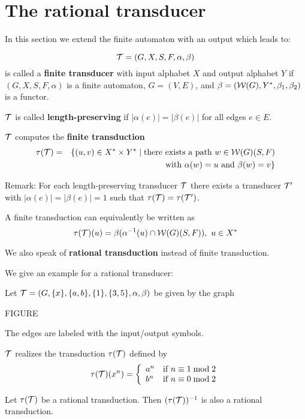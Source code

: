 \section{The rational transducer}

In this section we extend the finite automaton with an output which leads to:

\begin{definition}
\[ \mbox{$\mathcal{T}$} = (G, X, S, F, \alpha, \beta) \] is called a {\bf finite transducer}
with input alphabet $X$ and output alphabet $Y$ if $(G, X, S, F, \alpha)$ is a
finite automaton, $G = (V, E)$, and $\beta = (\mbox{$\mathcal{W}(G)$}, Y^*, \beta_1,
\beta_2)$ is a functor.
\end{definition}

$\mbox{$\mathcal{T}$}$ is called {\bf length-preserving} if $|\alpha(e)| = |\beta(e)|$ for all
edges $e \in E$.

$\mbox{$\mathcal{T}$}$ computes the {\bf finite transduction}
\begin{eqnarray*}
\tau(\mbox{$\mathcal{T}$}) & = & \{ (u, v) \in X^* \times Y^* \mid \mbox{there
exists a path } w \in \mbox{$\mathcal{W}(G)$}(S, F) \\
& &  \mbox{ with } \alpha(w) = u \mbox{ and } \beta(w) = v \}
\end{eqnarray*}

Remark: For each length-preserving transducer $\mbox{$\mathcal{T}$}$ there exists a
transducer $\mbox{$\mathcal{T'}$}$ with $|\alpha(e)| = |\beta(e)| = 1$ such that
$\tau(\mbox{$\mathcal{T}$}) = \tau(\mbox{$\mathcal{T'}$})$.

A finite transduction can equivalently be written as 
\[ \tau(\mbox{$\mathcal{T}$})(u) = \beta(\alpha^{-1}(u) \cap \mbox{$\mathcal{W}(G)$}(S, F)),\ u \in X^* \]

We also speak of {\bf rational transduction} instead of finite transduction.

We give an example for a rational transducer:

Let $\mbox{$\mathcal{T}$} = (G, \{x\}, \{a, b\}, \{1\}, \{3, 5\}, \alpha, \beta)$ be given by
the graph

FIGURE

The edges are labeled with the input/output symbols.

$\mbox{$\mathcal{T}$}$ realizes the transduction $\tau(\mbox{$\mathcal{T}$})$ defined by
\[ \tau(\fa{T})(x^n) = \left\{ 
\begin{array}{l@{\quad}l}
a^n & \mbox{if } n \equiv 1 \bmod 2 \\
b^n & \mbox{if } n \equiv 0 \bmod 2
\end{array}
\right. \]

\begin{lemma}
Let $\tau(\mbox{$\mathcal{T}$})$ be a rational transduction. Then $(\tau(\mbox{$\mathcal{T}$}))^{-1}$ is
also a rational transduction.
\end{lemma}

